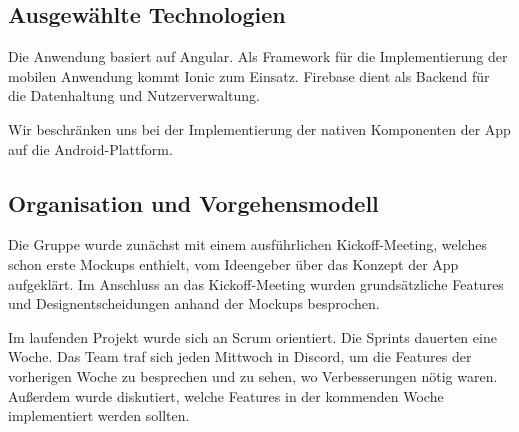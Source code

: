 \subsection{Ausgewählte Technologien}

Die Anwendung basiert auf Angular.
Als Framework für die Implementierung der mobilen Anwendung kommt Ionic zum Einsatz.
Firebase dient als Backend für die Datenhaltung und Nutzerverwaltung.

Wir beschränken uns bei der Implementierung der nativen Komponenten der App auf die Android-Plattform.

\pagebreak

\subsection{Organisation und Vorgehensmodell}

Die Gruppe wurde zunächst mit einem ausführlichen Kickoff-Meeting, welches schon erste Mockups enthielt, vom Ideengeber über das Konzept der App aufgeklärt.
Im Anschluss an das Kickoff-Meeting wurden grundsätzliche Features und Designentscheidungen anhand der Mockups besprochen.

Im laufenden Projekt wurde sich an Scrum orientiert.
Die Sprints dauerten eine Woche.
Das Team traf sich jeden Mittwoch in Discord, um die Features der vorherigen Woche zu besprechen und zu sehen, wo Verbesserungen nötig waren.
Außerdem wurde diskutiert, welche Features in der kommenden Woche implementiert werden sollten.
